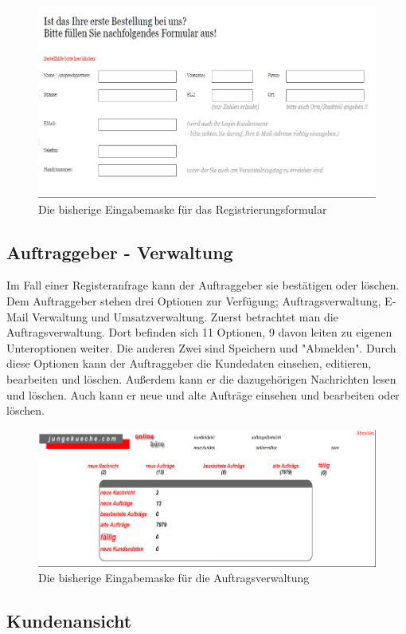 \begin{figure}
	\centering
	\includegraphics[width=0.7\linewidth]{Graphics/registerForm.png}
	\caption[Registerformular]{Die bisherige Eingabemaske für das Registrierungsformular}
	\label{fig:registerForm}
\end{figure}

\subsection{Auftraggeber - Verwaltung}

Im Fall einer Registeranfrage kann der Auftraggeber sie bestätigen oder löschen. Dem Auftraggeber stehen drei Optionen zur Verfügung; Auftragsverwaltung, E-Mail Verwaltung und Umsatzverwaltung. Zuerst betrachtet man die Auftragsverwaltung. Dort befinden sich 11 Optionen, 9 davon leiten zu eigenen Unteroptionen weiter. Die anderen Zwei sind Speichern und "Abmelden". Durch diese Optionen kann der Auftraggeber die Kundedaten einsehen, editieren, bearbeiten und löschen. Außerdem kann er die dazugehörigen Nachrichten lesen und löschen. Auch kann er neue und alte Aufträge einsehen und bearbeiten oder löschen.

\begin{figure}[h]
	\centering
	\includegraphics[width=0.7\linewidth]{Graphics/Auftragverwaltung.png}
	\caption[Auftragsverwaltung]{Die bisherige Eingabemaske für die Auftragsverwaltung}
	\label{fig:Auftragverwaltung}
\end{figure}

\subsection{Kundenansicht}

